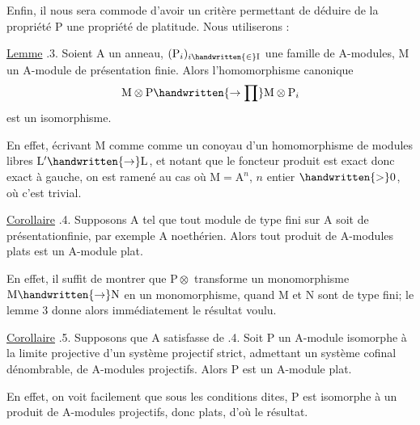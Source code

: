 
Enfin, il nous sera commode d'avoir un critère permettant de déduire de la propriété $\mathrm P$ une propriété de platitude. Nous utiliserons :

\uline{Lemme} .3. Soient $\mathrm A$ un anneau, $(\mathrm P_i)_{i\handwritten{\in}\mathrm I}$ une famille de $\mathrm A$-modules,  $\mathrm M$ un $\mathrm A$-module de présentation finie. Alors l'homomorphisme canonique
\[
\mathrm M\otimes\mathrm P\handwritten{\to\prod}\mathrm M\otimes\mathrm P_i
\]
est un isomorphisme.

En effet, écrivant $\mathrm M$ comme comme un conoyau d'un homomorphisme de modules libres  $\mathrm L'\handwritten{\to}\mathrm L$, et notant que le foncteur produit est exact donc exact à gauche, on est ramené au cas où $\mathrm M=\mathrm A^n$, $n$ entier $\handwritten{>}0$, où c'est trivial.

\uline{Corollaire} .4. Supposons $\mathrm A$ tel que tout module de type fini sur $\mathrm A$ soit de présentationfinie, par exemple $\mathrm A$ noethérien. Alors tout produit de $\mathrm A$-modules plats est un $\mathrm A$-module plat.

En effet, il suffit de montrer que $\mathrm P\otimes$ transforme un monomorphisme $\mathrm M\handwritten{\to}\mathrm N$ en un monomorphisme, quand $\mathrm M$ et $\mathrm N$ sont de type fini; le lemme 3 donne alors immédiatement le résultat voulu.

\uline{Corollaire} .5. Supposons que $\mathrm A$ satisfasse  de .4. Soit $\mathrm P$ un $\mathrm A$-module  isomorphe à la limite projective     d'un système projectif strict, admettant un système cofinal dénombrable, de $\mathrm A$-modules projectifs. Alors $\mathrm P$ est un $\mathrm A$-module plat.

En effet, on voit facilement que sous les conditions dites, $\mathrm P$ est isomorphe à un produit de $\mathrm A$-modules projectifs, donc plats, d'où le résultat.
